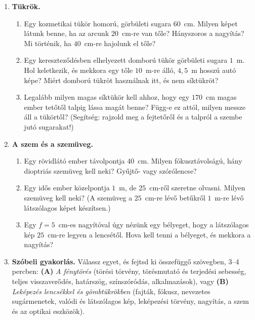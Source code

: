 \documentclass[12pt]{article}
\begin{document}
\newpage
\begin{enumerate}[start=8]
\item \textbf{Tükrök.}
  \begin{enumerate}
    \item Egy kozmetikai tükör homorú, görbületi sugara $60$~cm. Milyen képet látunk benne,
      ha az arcunk $20$~cm-re van tőle? Hányszoros a nagyítás? Mi történik, ha $40$~cm-re
      hajolunk el tőle?
    \item Egy kereszteződésben elhelyezett domború tükör görbületi sugara $1$~m. Hol
      keletkezik, és mekkora egy tőle $10$~m-re álló, $4{,}5$~m hosszú autó képe? Miért
      domború tükröt használnak itt, és nem síktükröt?
    \item Legalább milyen magas síktükör kell ahhoz, hogy egy $170$~cm magas ember tetőtől
      talpig lássa magát benne? Függ-e ez attól, milyen messze áll a tükörtől?
      (Segítség: rajzold meg a fejtetőről és a talpról a szembe jutó sugarakat!)
  \end{enumerate}

\item \textbf{A szem és a szemüveg.}
  \begin{enumerate}
    \item Egy rövidlátó ember távolpontja $40$~cm. Milyen fókusztávolságú, hány dioptriás
      szemüveg kell neki? Gyűjtő- vagy szórólencse?
    \item Egy idős ember közelpontja $1$~m, de $25$~cm-ről szeretne olvasni. Milyen szemüveg
      kell neki? (A szemüveg a $25$~cm-re lévő betűkről $1$~m-re lévő látszólagos képet
      készítsen.)
    \item Egy $f = 5$~cm-es nagyítóval úgy nézünk egy bélyeget, hogy a látszólagos kép
      $25$~cm-re legyen a lencsétől. Hova kell tenni a bélyeget, és mekkora a nagyítás?
  \end{enumerate}

\item \textbf{Szóbeli gyakorlás.} Válassz egyet, és fejtsd ki összefüggő szövegben, 3--4
  percben: \textbf{(A)} \emph{A fénytörés} (törési törvény, törésmutató és terjedési
  sebesség, teljes visszaverődés, határszög, színszóródás, alkalmazások), vagy
  \textbf{(B)} \emph{Leképezés lencsékkel és gömbtükrökben} (fajták, fókusz, nevezetes
  sugármenetek, valódi és látszólagos kép, leképezési törvény, nagyítás, a szem és az
  optikai eszközök).
\end{enumerate}
\end{document}
